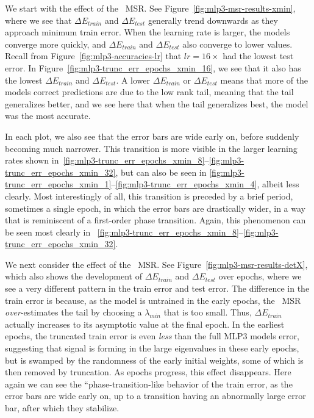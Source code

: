 We start with the effect of the \POWERLAW~MSR.
See Figure~\ref{fig:mlp3-msr-results-xmin}, where we see that $\Delta E_{train}$ and $\Delta E_{test}$ generally trend 
downwards as they approach minimum train error. 
When the learning rate is larger, the models converge more quickly, and $\Delta E_{train}$ and $\Delta E_{test}$ also converge to lower values. 
Recall from Figure~\ref{fig:mlp3-accuracies-lr} that $lr=16\times$ had the lowest test error. In 
Figure~\ref{fig:mlp3-trunc_err_epochs_xmin_16}, we see that it also has the lowest $\Delta E_{train}$ and $\Delta 
E_{test}$. A lower $\Delta E_{train}$ or $\Delta E_{test}$ means that more of the models correct predictions are due to 
the low rank tail, meaning that the tail generalizes better, and we see here that when the tail generalizes best, the 
model was the most accurate. 

In each plot, we also see that the error bars are wide early on, before suddenly becoming much narrower. This transition 
is more visible in the larger learning rates shown in~\ref{fig:mlp3-trunc_err_epochs_xmin_8}--\ref{fig:mlp3-trunc_err_epochs_xmin_32},
but can also be seen in \ref{fig:mlp3-trunc_err_epochs_xmin_1}--\ref{fig:mlp3-trunc_err_epochs_xmin_4}, albeit less 
clearly. Most interestingly of all, this transition is preceded by a brief period, sometimes a single epoch, in which the 
error bars are drastically wider, in a way that is reminiscent of a first-order phase transition. Again, this 
phenomenon can be seen most clearly in ~\ref{fig:mlp3-trunc_err_epochs_xmin_8}--\ref{fig:mlp3-trunc_err_epochs_xmin_32}.


We next consider the effect of the \TRACELOG~MSR.
See Figure~\ref{fig:mlp3-msr-results-detX}, which also shows the development of $\Delta E_{train}$ and $\Delta E_{test}$ 
over epochs, where we see a very different pattern in the train error and test error. 
The difference in the train error is because, as the model is untrained in the early epochs, the \TRACELOG~MSR 
\emph{over}-estimates the tail by choosing a $\lambda_{min}$ that is too small. 
Thus, $\Delta E_{train}$ actually increases to its asymptotic value at the final epoch. 
In the earliest epochs, the truncated train error is even \emph{less} than the full MLP3 models error, suggesting that 
signal is forming in the large eigenvalues in these early epochs, but is swamped by the randomness of the early initial 
weights, some of which is then removed by truncation. As epochs progress, this effect disappears.
%
Here again we can see the ``phase-transition-like behavior of the train error, as the error bars are wide early on, up to a transition having an abnormally large error bar, after which they stabilize.

